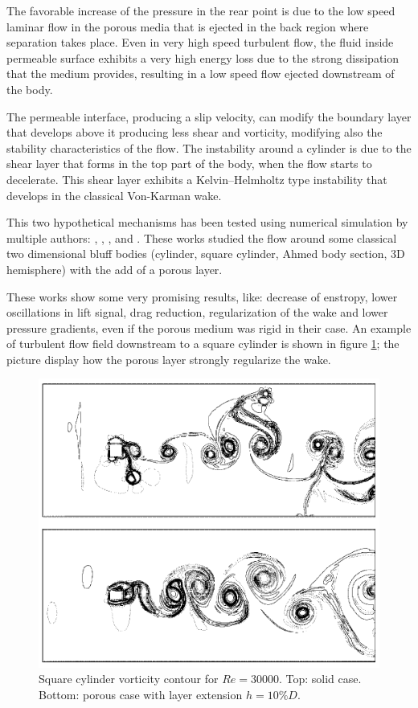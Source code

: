 The favorable increase of the pressure in the rear point is due to the low speed laminar flow in the porous media that is ejected in the back region where separation takes place.
Even in very high speed turbulent flow, the fluid inside permeable surface exhibits a very high energy loss due to the strong dissipation that the medium provides, resulting in a low speed flow ejected downstream of the body.

The permeable interface, producing a slip velocity, can modify the boundary layer that develops above it producing less shear and vorticity, modifying also the stability characteristics of the flow.
The instability around a cylinder is due to the shear layer that forms in the top part of the body, when the flow starts to decelerate.
This shear layer exhibits a Kelvin–Helmholtz type instability that develops in the classical Von-Karman wake.

This two hypothetical mechanisms has been tested using numerical simulation by multiple authors: \citet{bruneau2004passive}, \citet{bruneau2008numerical}, \citet{bhattacharyya2011reduction}, \citet{naito2012numerical} and \citet{mimeau2017passive}.
These works studied the flow around some classical two dimensional bluff bodies (cylinder, square cylinder, Ahmed body section, 3D hemisphere) with the add of a porous layer.

These works show some very promising results, like: decrease of enstropy, lower oscillations in lift signal, drag reduction, regularization of the wake and lower pressure gradients, even if the porous medium was rigid in their case.
An example of turbulent flow field downstream to a square cylinder is shown in figure \ref{fig:porous_cylinder}; the picture display how the porous layer strongly regularize the wake.

\begin{figure}[h]
	\centering
	\includegraphics[width=0.7\linewidth]{chapter_1/cylinder_porous}
	\caption{Square cylinder vorticity contour for $Re=30000$. Top: solid case. Bottom: porous case with layer extension $h=10\% D$.}
	\label{fig:porous_cylinder}
\end{figure}


